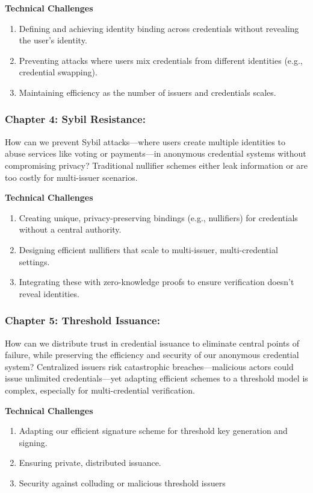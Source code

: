 \noindent \textbf{Technical Challenges}
\begin{enumerate}
    \item Defining and achieving identity binding across credentials without revealing the user’s identity.
    \item Preventing attacks where users mix credentials from different identities (e.g., credential swapping).
    \item Maintaining efficiency as the number of issuers and credentials scales.
\end{enumerate}



\subsubsection*{Chapter 4: Sybil Resistance: } 
How can we prevent Sybil attacks—where users create multiple identities to abuse services like voting or payments—in anonymous credential systems without compromising privacy? Traditional nullifier schemes either leak information or are too costly for multi-issuer scenarios.

\noindent \textbf{Technical Challenges}
\begin{enumerate}
    \item Creating unique, privacy-preserving bindings (e.g., nullifiers) for credentials without a central authority.
    \item Designing efficient nullifiers that scale to multi-issuer, multi-credential settings.
    \item Integrating these with zero-knowledge proofs to ensure verification doesn’t reveal identities.
\end{enumerate}



\subsubsection*{Chapter 5: Threshold Issuance: } 
How can we distribute trust in credential issuance to eliminate central points of failure, while preserving the efficiency and security of our anonymous credential system? Centralized issuers risk catastrophic breaches—malicious actors could issue unlimited credentials—yet adapting efficient schemes to a threshold model is complex, especially for multi-credential verification.

\noindent \textbf{Technical Challenges}
\begin{enumerate}
    \item Adapting our efficient signature scheme for threshold key generation and signing.
    \item Ensuring private, distributed issuance.
    \item Security against colluding or malicious threshold issuers
\end{enumerate}

